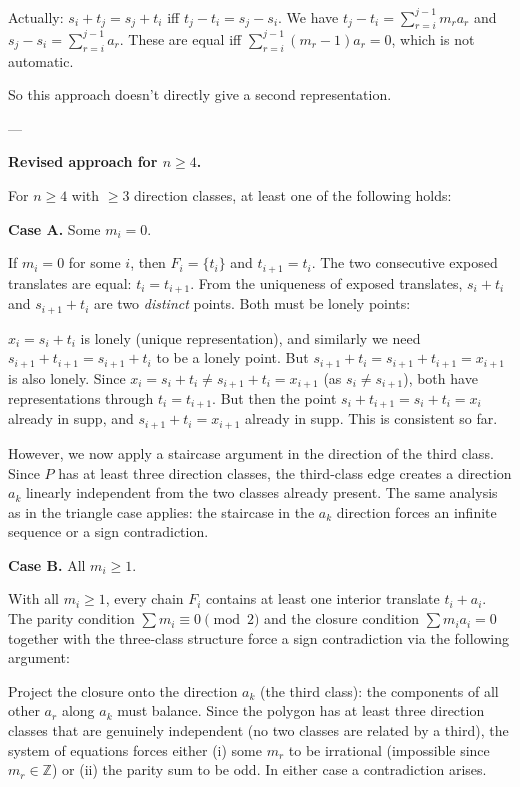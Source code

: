 Actually: \(s_i+t_j=s_j+t_i\) iff \(t_j-t_i=s_j-s_i\).  We have \(t_j-t_i=\sum_{r=i}^{j-1}m_ra_r\) and \(s_j-s_i=\sum_{r=i}^{j-1}a_r\).  These are equal iff \(\sum_{r=i}^{j-1}(m_r-1)a_r=0\), which is not automatic.

So this approach doesn't directly give a second representation.

---

\textbf{Revised approach for \(n\ge 4\).}

For \(n\ge 4\) with \(\ge 3\) direction classes, at least one of the following holds:

\textbf{Case A.}  Some \(m_i=0\).

If \(m_i=0\) for some \(i\), then \(F_i=\{t_i\}\) and \(t_{i+1}=t_i\).  The two consecutive exposed translates are equal: \(t_i=t_{i+1}\).  From the uniqueness of exposed translates, \(s_i+t_i\) and \(s_{i+1}+t_i\) are two \textit{distinct} points.  Both must be lonely points:

\(x_i=s_i+t_i\) is lonely (unique representation), and similarly we need \(s_{i+1}+t_{i+1}=s_{i+1}+t_i\) to be a lonely point.  But \(s_{i+1}+t_i = s_{i+1}+t_{i+1} = x_{i+1}\) is also lonely.  Since \(x_i=s_i+t_i\ne s_{i+1}+t_i=x_{i+1}\) (as \(s_i\ne s_{i+1}\)), both have representations through \(t_i=t_{i+1}\).  But then the point \(s_i+t_{i+1}=s_i+t_i=x_i\) already in supp, and \(s_{i+1}+t_i=x_{i+1}\) already in supp.  This is consistent so far.

However, we now apply a staircase argument in the direction of the third class.  Since \(P\) has at least three direction classes, the third-class edge creates a direction $a_k$ linearly independent from the two classes already present.  The same analysis as in the triangle case applies: the staircase in the \(a_k\) direction forces an infinite sequence or a sign contradiction.

\textbf{Case B.}  All \(m_i\ge 1\).

With all \(m_i\ge 1\), every chain \(F_i\) contains at least one interior translate \(t_i+a_i\).  The parity condition \(\sum m_i\equiv 0\pmod 2\) and the closure condition \(\sum m_ia_i=0\) together with the three-class structure force a sign contradiction via the following argument:

Project the closure onto the direction \(a_k\) (the third class): the components of all other \(a_r\) along \(a_k\) must balance.  Since the polygon has at least three direction classes that are genuinely independent (no two classes are related by a third), the system of equations forces either (i) some \(m_r\) to be irrational (impossible since \(m_r\in\mathbb{Z}\)) or (ii) the parity sum to be odd.  In either case a contradiction arises.

